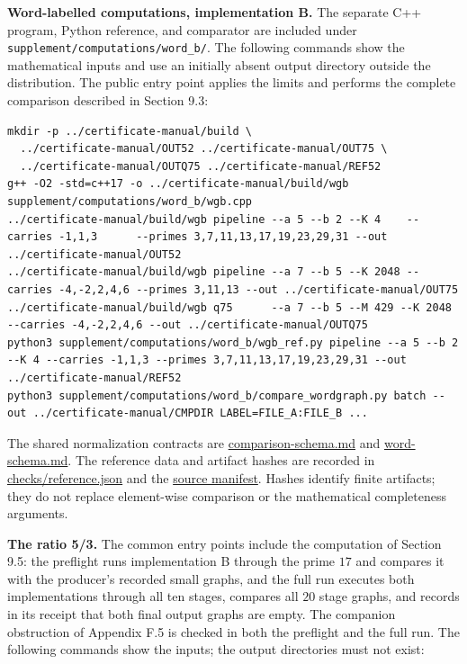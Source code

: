 \documentclass[11pt,reqno]{amsart}
\theoremstyle{definition}
\theoremstyle{remark}
\begin{document}
\textbf{Word-labelled computations, implementation B.} The separate C++
program, Python reference, and comparator are included under
\nolinkurl{supplement/computations/word_b/}. The following commands show
the mathematical inputs and use an initially absent output directory
outside the distribution. The public entry point applies the limits and
performs the complete comparison described in Section 9.3:

\begin{Verbatim}[fontsize=\small,breaklines=true,breakanywhere=true]
mkdir -p ../certificate-manual/build \
  ../certificate-manual/OUT52 ../certificate-manual/OUT75 \
  ../certificate-manual/OUTQ75 ../certificate-manual/REF52
g++ -O2 -std=c++17 -o ../certificate-manual/build/wgb supplement/computations/word_b/wgb.cpp
../certificate-manual/build/wgb pipeline --a 5 --b 2 --K 4    --carries -1,1,3      --primes 3,7,11,13,17,19,23,29,31 --out ../certificate-manual/OUT52
../certificate-manual/build/wgb pipeline --a 7 --b 5 --K 2048 --carries -4,-2,2,4,6 --primes 3,11,13 --out ../certificate-manual/OUT75
../certificate-manual/build/wgb q75      --a 7 --b 5 --M 429 --K 2048 --carries -4,-2,2,4,6 --out ../certificate-manual/OUTQ75
python3 supplement/computations/word_b/wgb_ref.py pipeline --a 5 --b 2 --K 4 --carries -1,1,3 --primes 3,7,11,13,17,19,23,29,31 --out ../certificate-manual/REF52
python3 supplement/computations/word_b/compare_wordgraph.py batch --out ../certificate-manual/CMPDIR LABEL=FILE_A:FILE_B ...
\end{Verbatim}

The shared normalization contracts are
\href{supplement/computations/comparison-schema.md}{comparison-schema.md} and
\href{supplement/computations/word-schema.md}{word-schema.md}.
The reference data and artifact hashes are recorded in \href{checks/reference.json}{checks/reference.json}
and the \href{MANIFEST.json}{source manifest}. Hashes identify finite artifacts; they do not
replace element-wise comparison or the mathematical completeness arguments.

\textbf{The ratio 5/3.} The common entry points include the computation of
Section 9.5: the preflight runs implementation B through the prime \(17\) and
compares it with the producer's recorded small graphs, and the full run executes
both implementations through all ten stages, compares all \(20\) stage graphs,
and records in its receipt that both final output graphs are empty. The
companion obstruction of Appendix F.5 is checked in both the preflight and the full run. The following commands
show the inputs; the output directories must not exist:
\end{document}
